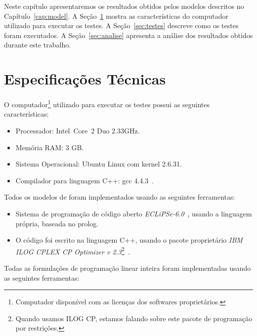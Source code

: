 Neste capítulo apresentaremos os resultados obtidos pelos modelos
descritos no Capítulo~\ref{cap:model}. A Seção~\ref{sec:tspec} mostra as
características do computador utilizado para executar os testes. A
Seção~\ref{sec:testes} descreve como os testes foram executados. A
Seção~\ref{sec:analise} apresenta a análise dos resultados obtidos
durante este trabalho.

\section{Especificações Técnicas}
\label{sec:tspec}
O computador\footnote{Computador disponível com as licenças dos
softwares proprietários.} utilizado para executar os testes possui as
seguintes características:

\begin{itemize}

    \item{Processador: Intel\textregistered{}~Core\texttrademark~2 Duo
        2.33GHz.}

    \item{Memória RAM: 3 GB.}

    \item{Sistema Operacional: Ubuntu Linux com kernel 2.6.31.}

    \item{Compilador para linguagem C++: gcc 4.4.3~\cite{gcc*2012}.}

\end{itemize}

Todos os modelos de \pr{} foram implementados usando as seguintes
ferramentas:

\begin{itemize}
    \item{Sistema de programação de código aberto
        \textit{ECLiPSe-6.0}~\cite{eclipse*2009}, usando a linguagem
        própria, baseada no prolog.}

    \item{O código foi escrito na linguagem C++, usando o pacote
        proprietário \textit{IBM\textregistered{} ILOG\textregistered{}
        CPLEX\textregistered{} CP Optimizer v 2.3}\footnote{Quando
        usamos ILOG CP, estamos falando sobre este pacote de programação
        por restrições.}~\cite{ilogcp*2011}.}
\end{itemize}

Todas as formulações de programação linear inteira foram implementadas
usando as seguintes ferramentas:

